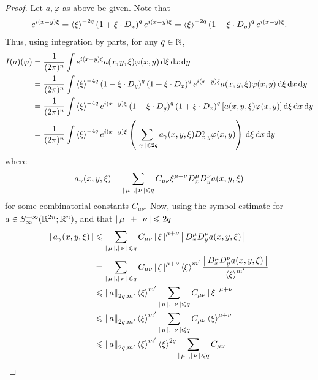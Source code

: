 \documentclass{article}
\begin{document}
\begin{proof}
    Let $a, \varphi$ as above be given. Note that 
    \begin{align*}
    e^{i(x - y)\xi} = \sym[\xi]^{-2q} \brac{1 + \xi \cdot D_x}^q e^{i (x - y) \xi } = \sym[\xi]^{-2q} \brac{1 - \xi \cdot D_y}^q e^{i (x - y) \xi }. 
    \end{align*}
    Thus, using integration by parts, for any $q \in \N$, 
    \begin{align*}
    I(a)(\varphi) 
    & = \frac{1}{(2\pi)^n} \int e^{i(x- y)\xi} a(x, y, \xi) \varphi(x, y) \d[\xi] \d[x] \d[y]\\
    & = \frac{1}{(2\pi)^n} \int \sym[\xi]^{-4q} \brac{1 - \xi \cdot D_y}^q \brac{1 + \xi \cdot D_x}^q e^{i (x - y) \xi } a(x, y, \xi) \varphi(x, y) \d[\xi] \d[x] \d[y]\\
    &= \frac{1}{(2\pi)^n} \int \sym[\xi]^{-4q} e^{i (x - y) \xi }  \brac{1 - \xi \cdot D_y}^q \brac{1 + \xi \cdot D_x}^q [a(x, y, \xi) \varphi(x, y)] \d[\xi] \d[x] \d[y]\\
    &=  \frac{1}{(2\pi)^n} \int \sym[\xi]^{-4q} e^{i (x - y) \xi } \brac{ \sum_{\abs{\gamma} \leq 2q} a_\gamma(x, y, \xi) D^\gamma_{x, y} \varphi(x, y)} \d[\xi] \d[x] \d[y]\\
    \end{align*}
    where 
    \begin{align*}
    a_\gamma(x, y, \xi) = \sum_{\abs{\mu}, \abs{\nu} \leq q} C_{\mu\nu} \xi^{\mu + \nu} D^\mu_x D^\nu_y a(x, y, \xi) 
    \end{align*}
    for some combinatorial constants $C_{\mu\nu}$. 
    Now, using the symbol estimate for $a \in S^{-\infty}_\infty(\R^{2n}; \R^n)$, and that $\abs{\mu} + \abs{\nu} \leq 2q$
    \begin{align*}
    \abs{a_\gamma(x, y, \xi)} 
    & \leq \sum_{\abs{\mu}, \abs{\nu} \leq q} C_{\mu\nu} \abs{\xi}^{\mu + \nu} \abs{D^\mu_x D^\nu_y a(x, y, \xi)} \\
    & = \sum_{\abs{\mu}, \abs{\nu} \leq q} C_{\mu\nu} \abs{\xi}^{\mu + \nu} \sym[\xi]^{m' } \frac{\abs{D^\mu_x D^\nu_y a(x, y, \xi)}}{\sym[\xi]^{m'}} \\
    & \leq \norm[a]_{2q, m'} \sym[\xi]^{m'} \sum_{\abs{\mu}, \abs{\nu} \leq q} C_{\mu\nu} \abs{\xi}^{\mu + \nu} \\
    &\leq \norm[a]_{2q, m'} \sym[\xi]^{m'} \sum_{\abs{\mu}, \abs{\nu} \leq q} C_{\mu\nu} \sym[\xi]^{\mu + \nu} \\    &\leq \norm[a]_{2q, m'} \sym[\xi]^{m'} \sym[\xi]^{2q}  \sum_{\abs{\mu}, \abs{\nu} \leq q} C_{\mu\nu} \\

\end{align*}
\end{proof}
\end{document}
